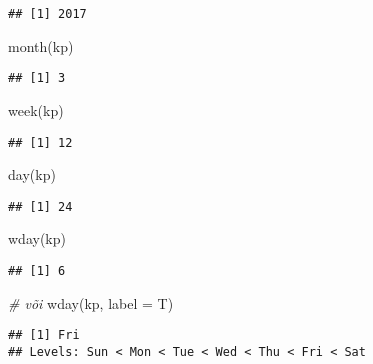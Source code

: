 \documentclass[
]{book}
\newenvironment{Shaded}{\begin{snugshade}}{\end{snugshade}}
\newcommand{\AttributeTok}[1]{\textcolor[rgb]{0.77,0.63,0.00}{#1}}
\newcommand{\CommentTok}[1]{\textcolor[rgb]{0.56,0.35,0.01}{\textit{#1}}}
\newcommand{\FunctionTok}[1]{\textcolor[rgb]{0.00,0.00,0.00}{#1}}
\newcommand{\NormalTok}[1]{#1}
\begin{document}
\begin{verbatim}
## [1] 2017
\end{verbatim}

\begin{Shaded}
\begin{Highlighting}[]
\FunctionTok{month}\NormalTok{(kp)}
\end{Highlighting}
\end{Shaded}

\begin{verbatim}
## [1] 3
\end{verbatim}

\begin{Shaded}
\begin{Highlighting}[]
\FunctionTok{week}\NormalTok{(kp)}
\end{Highlighting}
\end{Shaded}

\begin{verbatim}
## [1] 12
\end{verbatim}

\begin{Shaded}
\begin{Highlighting}[]
\FunctionTok{day}\NormalTok{(kp)}
\end{Highlighting}
\end{Shaded}

\begin{verbatim}
## [1] 24
\end{verbatim}

\begin{Shaded}
\begin{Highlighting}[]
\FunctionTok{wday}\NormalTok{(kp)}
\end{Highlighting}
\end{Shaded}

\begin{verbatim}
## [1] 6
\end{verbatim}

\begin{Shaded}
\begin{Highlighting}[]
\CommentTok{\# või}
\FunctionTok{wday}\NormalTok{(kp, }\AttributeTok{label =}\NormalTok{ T)}
\end{Highlighting}
\end{Shaded}

\begin{verbatim}
## [1] Fri
## Levels: Sun < Mon < Tue < Wed < Thu < Fri < Sat
\end{verbatim}
\end{document}

